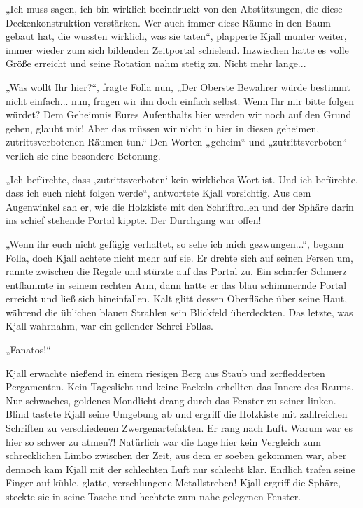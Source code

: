 „Ich muss sagen, ich bin wirklich beeindruckt von den Abstützungen, die diese Deckenkonstruktion verstärken. Wer auch immer diese Räume in den Baum gebaut hat, die wussten wirklich, was sie taten“, plapperte Kjall munter weiter, immer wieder zum sich bildenden Zeitportal schielend. Inzwischen hatte es volle Größe erreicht und seine Rotation nahm stetig zu. Nicht mehr lange...

„Was wollt Ihr hier?“, fragte Folla nun, „Der Oberste Bewahrer würde bestimmt nicht einfach... nun, fragen wir ihn doch einfach selbst. Wenn Ihr mir bitte folgen würdet? Dem Geheimnis Eures Aufenthalts hier werden wir noch auf den Grund gehen, glaubt mir! Aber das müssen wir nicht in hier in diesen geheimen, zutrittsverbotenen Räumen tun.“ Den Worten „geheim“ und „zutrittsverboten“ verlieh sie eine besondere Betonung.

„Ich befürchte, dass ‚zutrittsverboten‘ kein wirkliches Wort ist. Und ich befürchte, dass ich euch nicht folgen werde“, antwortete Kjall vorsichtig. Aus dem Augenwinkel sah er, wie die Holzkiste mit den Schriftrollen und der Sphäre darin ins schief stehende Portal kippte. Der Durchgang war offen!

„Wenn ihr euch nicht gefügig verhaltet, so sehe ich mich gezwungen...“, begann Folla, doch Kjall achtete nicht mehr auf sie. Er drehte sich auf seinen Fersen um, rannte zwischen die Regale und stürzte auf das Portal zu. Ein scharfer Schmerz entflammte in seinem rechten Arm, dann hatte er das blau schimmernde Portal erreicht und ließ sich hineinfallen. Kalt glitt dessen Oberfläche über seine Haut, während die üblichen blauen Strahlen sein Blickfeld überdeckten. Das letzte, was Kjall wahrnahm, war ein gellender Schrei Follas.

„Fanatos!“




Kjall erwachte nießend in einem riesigen Berg aus Staub und zerfledderten Pergamenten. Kein Tageslicht und keine Fackeln erhellten das Innere des Raums. Nur schwaches, goldenes Mondlicht drang durch das Fenster zu seiner linken. Blind tastete Kjall seine Umgebung ab und ergriff die Holzkiste mit zahlreichen Schriften zu verschiedenen Zwergenartefakten. Er rang nach Luft. Warum war es hier so schwer zu atmen?! Natürlich war die Lage hier kein Vergleich zum schrecklichen Limbo zwischen der Zeit, aus dem er soeben gekommen war, aber dennoch kam Kjall mit der schlechten Luft nur schlecht klar. Endlich trafen seine Finger auf kühle, glatte, verschlungene Metallstreben! Kjall ergriff die Sphäre, steckte sie in seine Tasche und hechtete zum nahe gelegenen Fenster.

